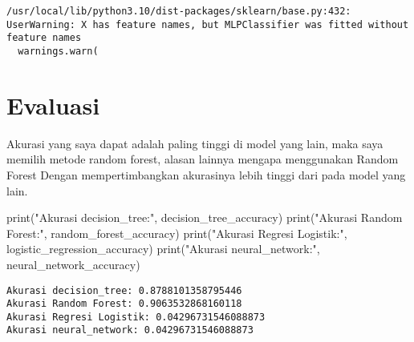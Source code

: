 \documentclass[
  letterpaper,
]{krantz}
\makeatletter
\newenvironment{Shaded}{\begin{snugshade}}{\end{snugshade}}
\newcommand{\BuiltInTok}[1]{\textcolor[rgb]{0.00,0.23,0.31}{#1}}
\newcommand{\NormalTok}[1]{\textcolor[rgb]{0.00,0.23,0.31}{#1}}
\newcommand{\StringTok}[1]{\textcolor[rgb]{0.13,0.47,0.30}{#1}}
\newenvironment{kframe}{%
\medskip{}
\setlength{\fboxsep}{.8em}
 \def\at@end@of@kframe{}%
 \ifinner\ifhmode%
  \def\at@end@of@kframe{\end{minipage}}%
  \begin{minipage}{\columnwidth}%
 \fi\fi%
 \def\FrameCommand##1{\hskip\@totalleftmargin \hskip-\fboxsep
 \colorbox{shadecolor}{##1}\hskip-\fboxsep
     \hskip-\linewidth \hskip-\@totalleftmargin \hskip\columnwidth}%
 \MakeFramed {\advance\hsize-\width
   \@totalleftmargin\z@ \linewidth\hsize
   \@setminipage}}%
 {\par\unskip\endMakeFramed%
 \at@end@of@kframe}
\renewenvironment{Shaded}{\begin{kframe}}{\end{kframe}}
\makeatother
\begin{document}
\begin{verbatim}
/usr/local/lib/python3.10/dist-packages/sklearn/base.py:432: UserWarning: X has feature names, but MLPClassifier was fitted without feature names
  warnings.warn(
\end{verbatim}

\hypertarget{evaluasi}{%
\section{Evaluasi}\label{evaluasi}}

Akurasi yang saya dapat adalah paling tinggi di model yang lain, maka
saya memilih metode random forest, alasan lainnya mengapa menggunakan
Random Forest Dengan mempertimbangkan akurasinya lebih tinggi dari pada
model yang lain.

\begin{Shaded}
\begin{Highlighting}[]
\BuiltInTok{print}\NormalTok{(}\StringTok{"Akurasi decision\_tree:"}\NormalTok{, decision\_tree\_accuracy)}
\BuiltInTok{print}\NormalTok{(}\StringTok{"Akurasi Random Forest:"}\NormalTok{, random\_forest\_accuracy)}
\BuiltInTok{print}\NormalTok{(}\StringTok{"Akurasi Regresi Logistik:"}\NormalTok{, logistic\_regression\_accuracy)}
\BuiltInTok{print}\NormalTok{(}\StringTok{"Akurasi neural\_network:"}\NormalTok{, neural\_network\_accuracy)}
\end{Highlighting}
\end{Shaded}

\begin{verbatim}
Akurasi decision_tree: 0.8788101358795446
Akurasi Random Forest: 0.9063532868160118
Akurasi Regresi Logistik: 0.04296731546088873
Akurasi neural_network: 0.04296731546088873
\end{verbatim}
\end{document}
